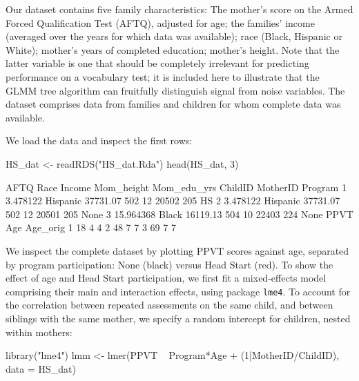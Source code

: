 \documentclass[doc,floatsintext,natbib]{apa7}
\begin{document}

Our dataset contains five family characteristics: The mother's score on the Armed Forced Qualification Test (AFTQ), adjusted for age; the families' income (averaged over the years for which data was available); race (Black, Hispanic or White); mother's years of completed education; mother's height. Note that the latter variable is one that should be completely irrelevant for predicting performance on a vocabulary test; it is included here to illustrate that the GLMM tree algorithm can fruitfully distinguish signal from noise variables. The dataset comprises data from families and children for whom complete data was available. 

We load the data and inspect the first rows:

\begin{Schunk}
\begin{Sinput}
 HS_dat <- readRDS("HS_dat.Rda")
 head(HS_dat, 3)
\end{Sinput}
\begin{Soutput}
       AFTQ     Race   Income Mom_height Mom_edu_yrs ChildID MotherID Program
1  3.478122 Hispanic 37731.07        502          12   20502      205      HS
2  3.478122 Hispanic 37731.07        502          12   20501      205    None
3 15.964368    Black 16119.13        504          10   22403      224    None
  PPVT Age Age_orig
1   18   4        4
2   48   7        7
3   69   7        7
\end{Soutput}
\end{Schunk}

We inspect the complete dataset by plotting PPVT scores against age, separated by program participation: None (black) versus Head Start (red). To show the effect of age and Head Start participation, we first fit a mixed-effects model comprising their main and interaction effects, using package \texttt{lme4}. To account for the correlation between repeated assessments on the same child, and between siblings with the same mother, we specify a random intercept for children, nested within mothers:

\begin{Schunk}
\begin{Sinput}
 library("lme4")
 lmm <- lmer(PPVT ~ Program*Age + (1|MotherID/ChildID), data = HS_dat)
\end{Sinput}
\end{Schunk}
\end{document}
